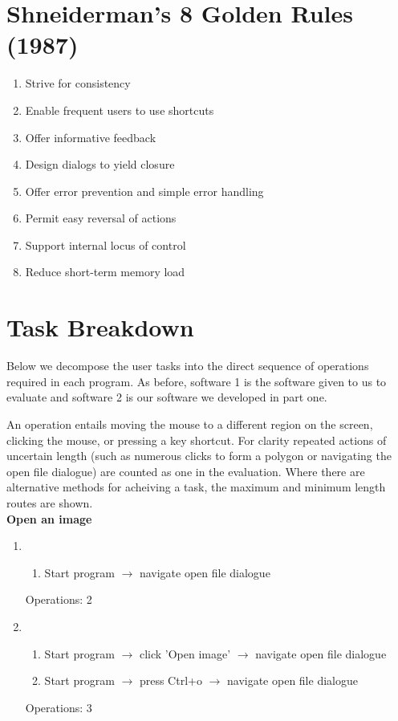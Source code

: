 \documentclass[a4paper,11pt,oneside]{article}
\begin{document}
\section{Shneiderman’s 8 Golden Rules (1987)}
\label{sec:s_rules}
\begin{enumerate}
    \item Strive for consistency
    \item Enable frequent users to use shortcuts
    \item Offer informative feedback
    \item Design dialogs to yield closure
    \item Offer error prevention and simple error handling
    \item Permit easy reversal of actions
    \item Support internal locus of control
    \item Reduce short-term memory load 
\end{enumerate}

\section{Task Breakdown}
\label{sec:task_breakdown}

Below we decompose the user tasks into the direct sequence of operations required in each program. As before, software 1 is the software given to us to evaluate and software 2 is our software we developed in part one.

An operation entails moving the mouse to a different region on the screen, clicking the mouse, or pressing a key shortcut. For clarity repeated actions of uncertain length (such as numerous clicks to form a polygon or navigating the open file dialogue) are counted as one in the evaluation. Where there are alternative methods for acheiving a task, the maximum and minimum length routes are shown.\\

{\bf Open an image}
\begin{enumerate}
    \item
    \begin{enumerate}
        \item Start program $\rightarrow$ navigate open file dialogue
    \end{enumerate}
    Operations: 2
    \item
    \begin{enumerate}
        \item Start program $\rightarrow$ click 'Open image' $\rightarrow$ navigate open file dialogue
        \item Start program $\rightarrow$ press Ctrl+o $\rightarrow$ navigate open file dialogue
    \end{enumerate}
    Operations: 3
\end{enumerate}
\end{document}

